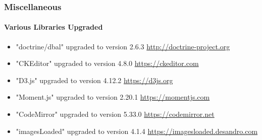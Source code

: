 \begin{frame}[fragile]
	\frametitle{Miscellaneous}
	\framesubtitle{Various Libraries Upgraded}

	\begin{itemize}
		\item "doctrine/dbal" upgraded to version 2.6.3\newline
			\smaller
				\href{http://doctrine-project.org}{http://doctrine-project.org}
			\normalsize

		\item "CKEditor" upgraded to version 4.8.0\newline
			\smaller
				\href{https://ckeditor.com}{https://ckeditor.com}
			\normalsize

		\item "D3.js" upgraded to version 4.12.2\newline
			\smaller
				\href{https://d3js.org}{https://d3js.org}
			\normalsize

		\item "Moment.js" upgraded to version 2.20.1\newline
			\smaller
				\href{https://momentjs.com}{https://momentjs.com}
			\normalsize

		\item "CodeMirror" upgraded to version 5.33.0\newline
			\smaller
				\href{https://codemirror.net}{https://codemirror.net}
			\normalsize

		\item "imagesLoaded" upgraded to version 4.1.4\newline
			\smaller
				\href{https://imagesloaded.desandro.com}{https://imagesloaded.desandro.com}
			\normalsize

	\end{itemize}

\end{frame}

